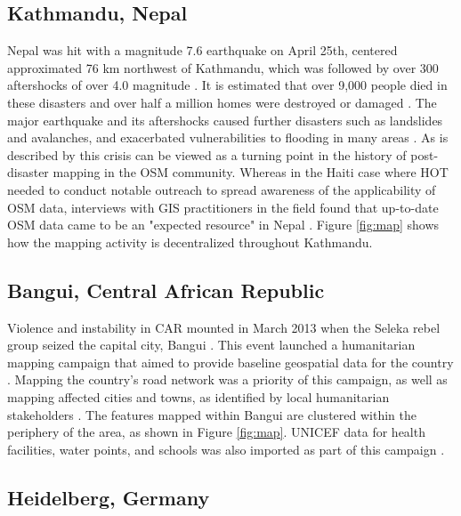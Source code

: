 \subsection{Kathmandu, Nepal}

Nepal was hit with a magnitude 7.6 earthquake on April 25th, centered approximated 76 km northwest of Kathmandu, which was followed by over 300 aftershocks of over 4.0 magnitude \parencite{noauthor_nepal_2015}. It is estimated that over 9,000 people died in these disasters and over half a million homes were destroyed or damaged \parencite{noauthor_nepal_2015}. The major earthquake and its aftershocks caused further disasters such as landslides and avalanches, and exacerbated vulnerabilities to flooding in many areas \parencite{noauthor_nepal_2015}. As is described by \textcite{soden_infrastructure_2016} this crisis can be viewed as a turning point in the history of post-disaster mapping in the OSM community. Whereas in the Haiti case where HOT needed to conduct notable outreach to spread awareness of the applicability of OSM data, interviews with GIS practitioners in the field found that up-to-date OSM data came to be an "expected resource" in Nepal \parencite[p. 2801]{soden_infrastructure_2016}. Figure \ref{fig:map} shows how the mapping activity is decentralized throughout Kathmandu.

\subsection{Bangui, Central African Republic}

Violence and instability in CAR mounted in March 2013 when the Seleka rebel group seized the capital city, Bangui \parencite{global_conflict_tracker_violence_2020}. This event launched a humanitarian mapping campaign that aimed to provide baseline geospatial data for the country \parencite{openstreetmap_wiki_wikiproject_2020}. Mapping the country's road network was a priority of this campaign, as well as mapping affected cities and towns, as identified by local humanitarian stakeholders \parencite{openstreetmap_wiki_wikiproject_2020}. The features mapped within Bangui are clustered within the periphery of the area, as shown in Figure \ref{fig:map}. UNICEF data for health facilities, water points, and schools was also imported as part of this campaign \parencite{openstreetmap_wiki_wikiproject_2020}.

\subsection{Heidelberg, Germany}

